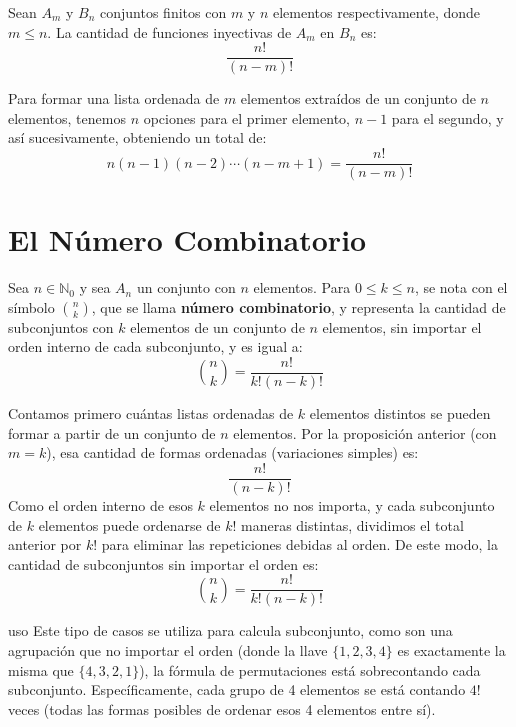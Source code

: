\begin{proposicion}[title= Cantidad de funciones inyectivas]
    Sean $A_m$ y $B_n$ conjuntos finitos con $m$ y $n$ elementos respectivamente, donde $m \leq n$.
    La cantidad de funciones inyectivas de $A_m$ en $B_n$ es:
    \[
        \frac{n!}{(n-m)!}
    \]
\end{proposicion}

\begin{demostracion}
    Para formar una lista ordenada de $m$ elementos extraídos de un conjunto de $n$ elementos, tenemos $n$ opciones para el primer elemento, $n-1$ para el segundo, y así sucesivamente, obteniendo un total de:
    \[
    n(n-1)(n-2)\cdots(n-m+1) = \frac{n!}{(n-m)!}
    \]
\end{demostracion}

\section{El Número Combinatorio}

\begin{proposicion}[title=Teorema: Número Combinatorio]
    Sea $n \in \mathbb{N}_0$ y sea $A_n$ un conjunto con $n$ elementos. Para $0 \leq k \leq n$, se nota con el símbolo $\binom{n}{k}$, que se llama \textbf{número combinatorio}, y representa la cantidad de subconjuntos con $k$ elementos de un conjunto de $n$ elementos, sin importar el orden interno de cada subconjunto, y es igual a:
    \[
    \binom{n}{k} = \frac{n!}{k!(n-k)!}
    \]
\end{proposicion}

\begin{demostracion}
    Contamos primero cuántas listas ordenadas de $k$ elementos distintos se pueden formar a partir de un conjunto de $n$ elementos. Por la proposición anterior (con $m=k$), esa cantidad de formas ordenadas (variaciones simples) es:
    \[
    \frac{n!}{(n-k)!}
    \]
    Como el orden interno de esos $k$ elementos no nos importa, y cada subconjunto de $k$ elementos puede ordenarse de $k!$ maneras distintas, dividimos el total anterior por $k!$ para eliminar las repeticiones debidas al orden. De este modo, la cantidad de subconjuntos sin importar el orden es:
    \[
    \binom{n}{k} = \frac{n!}{k!(n-k)!}
    \]
\end{demostracion}
\begin{nota}{uso}
Este tipo de casos se utiliza para calcula subconjunto, como son una agrupación que no importar el orden 
(donde la llave $\{1, 2, 3, 4\}$ es exactamente la misma que $\{4, 3, 2, 1\}$),
 la fórmula de permutaciones está sobrecontando cada subconjunto. 
 Específicamente, cada grupo de 4 elementos se está contando $4!$ 
 veces (todas las formas posibles de ordenar esos 4 elementos entre sí).
\end{nota}

